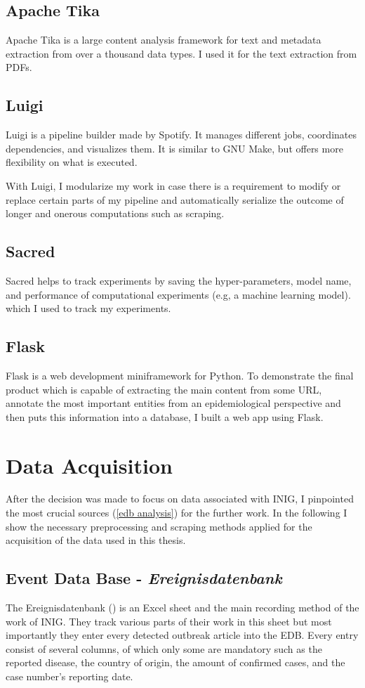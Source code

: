 \subsection{Apache Tika}\label{Tika}
Apache Tika is a large content analysis framework for text and metadata extraction from over a thousand data types. I used it for the text extraction from PDFs.

\subsection{Luigi}
Luigi is a pipeline builder made by Spotify. It manages different jobs, coordinates dependencies, and visualizes them. It is similar to GNU Make, but offers more flexibility on what is executed.

With Luigi, I modularize my work in case there is a requirement to modify or replace certain parts of my pipeline and automatically serialize the outcome of longer and onerous computations such as scraping.

\subsection{Sacred}
Sacred helps to track experiments by saving the hyper-parameters, model name, and performance of computational experiments (e.g, a machine learning model).
which I used to track my experiments.

\subsection{Flask}
Flask is a web development miniframework for Python.
To demonstrate the final product which is capable of extracting the main content from some URL, annotate the most important entities from an epidemiological perspective and then puts this information into a database, I built a web app using Flask.

\section{Data Acquisition}
After the decision was made to focus on data associated with INIG, I pinpointed the most crucial sources (\ref{edb analysis}) for the further work. In the following I show the necessary preprocessing and scraping methods applied for the acquisition of the data used in this thesis.

\subsection{Event Data Base - \textit{Ereignisdatenbank}}
The Ereignisdatenbank () is an Excel sheet and the main recording method of the work of INIG. They track various parts of their work in this sheet but most importantly they enter every detected outbreak article into the EDB. Every entry consist of several columns, of which only some are mandatory such as the reported disease, the country of origin, the amount of confirmed cases, and the case number's reporting date.


